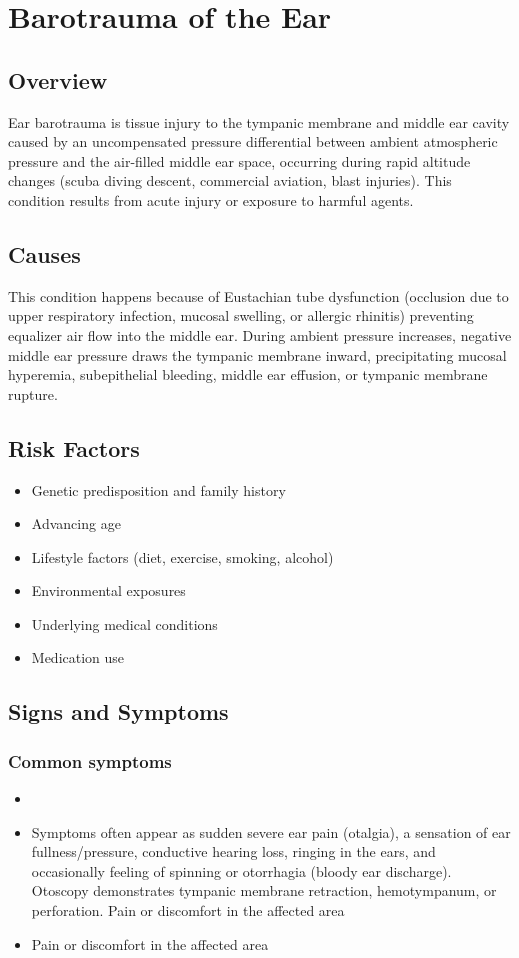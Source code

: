 \chapter{Barotrauma of the Ear}
\label{sec:Barotrauma of the Ear}

\section{Overview}
Ear barotrauma is tissue injury to the tympanic membrane and middle ear cavity caused by an uncompensated pressure differential between ambient atmospheric pressure and the air-filled middle ear space, occurring during rapid altitude changes (scuba diving descent, commercial aviation, blast injuries). This condition results from acute injury or exposure to harmful agents.
\section{Causes}
This condition happens because of Eustachian tube dysfunction (occlusion due to upper respiratory infection, mucosal swelling, or allergic rhinitis) preventing equalizer air flow into the middle ear. During ambient pressure increases, negative middle ear pressure draws the tympanic membrane inward, precipitating mucosal hyperemia, subepithelial bleeding, middle ear effusion, or tympanic membrane rupture.     
\section{Risk Factors}

\begin{itemize}[noitemsep]
  \item Genetic predisposition and family history
  \item Advancing age
  \item Lifestyle factors (diet, exercise, smoking, alcohol)
  \item Environmental exposures
  \item Underlying medical conditions
  \item Medication use
\end{itemize}
\section{Signs and Symptoms}

\subsection{Common symptoms}
\begin{itemize}[noitemsep]
  \item \item Symptoms often appear as sudden severe ear pain (otalgia), a sensation of ear fullness/pressure, conductive hearing loss, ringing in the ears, and occasionally feeling of spinning or otorrhagia (bloody ear discharge). Otoscopy demonstrates tympanic membrane retraction, hemotympanum, or perforation. Pain or discomfort in the affected area    \item Pain or discomfort in the affected area
  \end{itemize}

